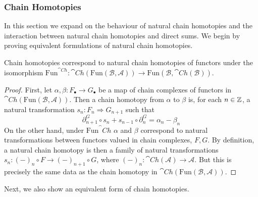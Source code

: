 \subsubsection{Chain Homotopies}\label{subsec:chainHomotop}


In this section we expand on the behaviour of natural chain homotopies and the interaction between natural chain homotopies and direct sums. We begin by proving equivalent formulations of natural chain homotopies.

\begin{lem}[label=lem:natHomotopIsChainFunctHomotop]
    Chain homotopies correspond to natural chain homotopies of functors under the isomorphism $\text{Fun}^{\cat{Ch}}:\cat{Ch}(\text{Fun}(\mathcal{B},\mathcal{A}))\to \text{Fun}(\mathcal{B},\cat{Ch}(\mathcal{B}))$.
\end{lem}
\begin{proof}
    First, let $\alpha,\beta:F_\bullet\to G_\bullet$ be a map of chain complexes of functors in $\cat{Ch}(\text{Fun}(\mathcal{B},\mathcal{A}))$. Then a chain homotopy from $\alpha$ to $\beta$ is, for each $n \in \mathbb Z$, a natural transformation $s_n:F_n\Rightarrow G_{n+1}$ such that 
    \begin{equation*}
        \partial_{n+1}^G\circ s_n + s_{n-1}\circ \partial_n^G = \alpha_n-\beta_n
    \end{equation*}
    On the other hand, under $\text{Fun}^\cat{Ch}$ $\alpha$ and $\beta$ correspond to natural transformations between functors valued in chain complexes, $F,G$. By definition, a natural chain homotopy is then a family of natural transformations $s_n: (-)_n\circ F\to (-)_{n+1}\circ G$, where $(-)_n:\cat{Ch}(\mathcal{A})\to \mathcal{A}$. But this is precisely the same data as the chain homotopy in $\cat{Ch}(\text{Fun}(\mathcal{B},\mathcal{A}))$.
\end{proof}

Next, we also show an equivalent form of chain homotopies.

